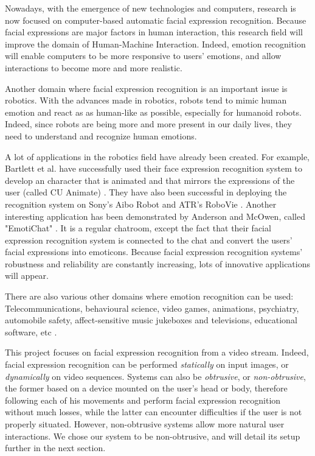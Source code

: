 \noindent Nowadays, with the emergence of new technologies and computers, research is now focused on computer-based automatic facial expression recognition. Because facial expressions are major factors in human interaction, this research field will improve the domain of Human-Machine Interaction. Indeed, emotion recognition will enable computers to be more responsive to users' emotions, and allow interactions to become more and more realistic. 
\newline

\noindent Another domain where facial expression recognition is an important issue is robotics. With the advances made in robotics, robots tend to mimic human emotion and react as as human-like as possible, especially for humanoid robots. Indeed, since robots are being more and more present in our daily lives, they need to understand and recognize human emotions.
\newline

\noindent A lot of applications in the robotics field have already been created. For example, Bartlett et al. have successfully used their face expression recognition system to develop an character that is animated and that mirrors the expressions of the user (called CU Animate) \cite{BAR03}. They have also been successful in deploying the recognition system on Sony's Aibo Robot and ATR's RoboVie \cite{BAR03}. Another interesting application has been demonstrated by Anderson and McOwen, called "EmotiChat" \cite{AND06}. It is a regular chatroom, except the fact that their facial expression recognition system is connected to the chat and convert the users' facial expressions into emoticons. Because facial expression recognition systems' robustness and reliability are constantly increasing, lots of innovative applications will appear.
\newline

\noindent There are also various other domains where emotion recognition can be used: Telecommunications, behavioural science, video games, animations, psychiatry, automobile safety, affect-sensitive music jukeboxes and televisions, educational software, etc \cite{BET12}.
\newline

\noindent This project focuses on facial expression recognition from a video stream. Indeed, facial expression recognition can be performed \textit{statically} on input images, or \textit{dynamically} on video sequences. Systems can also be \textit{obtrusive}, or \textit{non-obtrusive}, the former based on a device mounted on the user's head or body, therefore following each of his movements and perform facial expression recognition without much losses, while the latter can encounter difficulties if the user is not properly situated. However, non-obtrusive systems allow more natural user interactions. We chose our system to be non-obtrusive, and will detail its setup further in the next section.
\newline